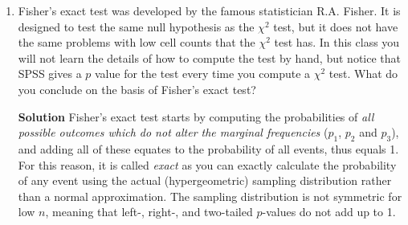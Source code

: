\begin{enumerate}
\begin{enumerate}
\begin{framed}{\textbf{Solution}}
        Note that the confidence interval given is unbounded as it tends to $\infty$? This is because of the inclusion of the zero in our table: the odds ratio is $OR = (2/23)/(0/20) = (2/23) \times (20/0) = \infty$ and everyone knows you can't divide by zero. The computation of the 95\% Confidence Interval for the odds ratio is as follows:
        \begin{align}
            se_{\ln{\brac{OR}}} &= \sqrt{\frac{1}{2} + \frac{1}{0} + \frac{1}{23} + \frac{1}{20}} = \sqrt{\infty}. 
            \shortintertext{95\% CI for odds ratio:}
            \exp{\cbrac{\ln{\brac{OR}} \pm 1.96 \times se_{\ln{\brac{OR}}}}} &= \exp{\cbrac{\ln{\brac{\infty}} \pm 1.96 \times \sqrt{\infty}}} \\
            &= \brac{\infty \times e^{-1.96 \times \sqrt{\infty}} , \infty \times e^{1.96 \times \sqrt{\infty}}} \\
            &= \brac{0.2316 , \infty}.
        \end{align}
        This issue is not present when you don't have zero values in the table - a rearrangement of the columns does not aid us any further as we still have the zero in the odds ratio and the computation of the standard error. 
        \end{framed}
        
        \item Fisher's exact test was developed by the famous statistician R.A. Fisher. It is designed to test the same null hypothesis as the $\chi^2$ test, but it does not have the same problems with low cell counts that the $\chi^2$ test has. In this class you will not learn the details of how to compute the test by hand, but notice that SPSS gives a $p$ value for the test every time you compute a $\chi^2$ test. What do you conclude on the basis of Fisher's exact test?
        \begin{framed}{\textbf{Solution}}
        Fisher's exact test starts by computing the probabilities of \textit{all possible outcomes which do not alter the marginal frequencies} ($p_1$, $p_2$ and $p_3$), and adding all of these equates to the probability of all events, thus equals 1. For this reason, it is called \textit{exact} as you can exactly calculate the probability of any event using the actual (hypergeometric) sampling distribution rather than a normal approximation. The sampling distribution is not symmetric for low $n$, meaning that left-, right-, and two-tailed $p$-values do not add up to 1.
        \end{framed}
        

\end{enumerate}
\end{enumerate}
